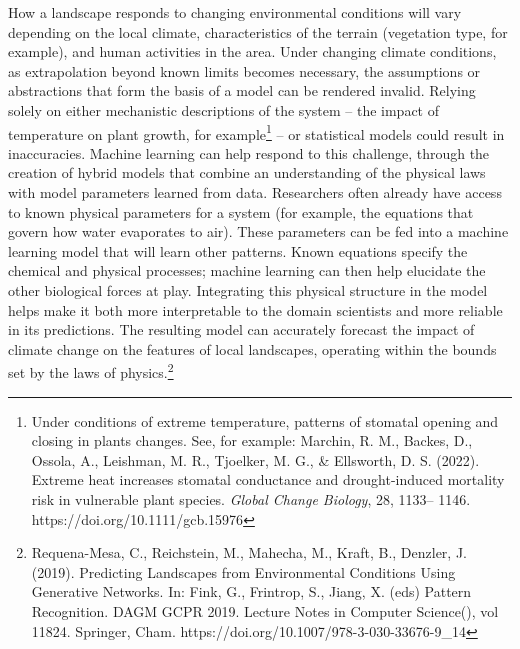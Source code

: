{How a landscape responds to changing environmental conditions will vary
depending on the local climate, characteristics of the terrain
(vegetation type, for example), and human activities in the area. Under
changing climate conditions, as extrapolation beyond known limits
becomes necessary, the assumptions or abstractions that form the basis
of a model can be rendered invalid. Relying solely on either mechanistic
descriptions of the system -- the impact of temperature on plant growth,
for example\footnote{Under conditions of extreme temperature, patterns
  of stomatal opening and closing in plants changes. See, for example:
  Marchin, R. M., Backes, D., Ossola, A., Leishman, M. R., Tjoelker, M.
  G., \& Ellsworth, D. S. (2022). Extreme heat increases stomatal
  conductance and drought-induced mortality risk in vulnerable plant
  species. \emph{Global Change Biology}, 28, 1133-- 1146.
  https://doi.org/10.1111/gcb.15976} -- or statistical models could
result in inaccuracies. Machine learning can help respond to this
challenge, through the creation of hybrid models that combine an
understanding of the physical laws with model parameters learned from
data. Researchers often already have access to known physical parameters
for a system (for example, the equations that govern how water
evaporates to air). These parameters can be fed into a machine learning
model that will learn other patterns. Known equations specify the
chemical and physical processes; machine learning can then help
elucidate the other biological forces at play. Integrating this physical
structure in the model helps make it both more interpretable to the
domain scientists and more reliable in its predictions. The resulting
model can accurately forecast the impact of climate change on the
features of local landscapes, operating within the bounds set by the
laws of physics.\footnote{Requena-Mesa, C., Reichstein, M., Mahecha, M.,
  Kraft, B., Denzler, J. (2019). Predicting Landscapes from
  Environmental Conditions Using Generative Networks. In: Fink, G.,
  Frintrop, S., Jiang, X. (eds) Pattern Recognition. DAGM GCPR 2019.
  Lecture Notes in Computer Science(), vol 11824. Springer, Cham.
  https://doi.org/10.1007/978-3-030-33676-9\_14}

}
